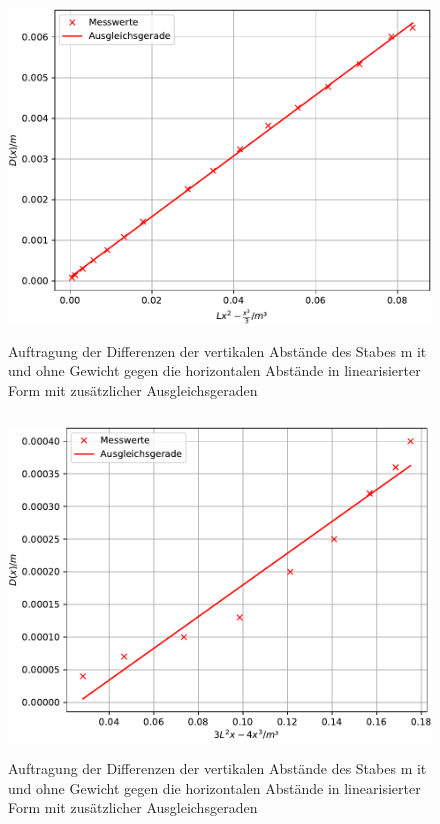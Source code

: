 \begin{figure}
  \centering
  \includegraphics[width=12cm, height=9cm]{./plots/Stange2.pdf}
  \caption{Auftragung der Differenzen der vertikalen Abstände des Stabes m      it und ohne Gewicht gegen die horizontalen Abstände in linearisierter Form       mit zusätzlicher Ausgleichsgeraden}
  \label{fig:plot2}
\end{figure}





\begin{figure}
  \centering
  \includegraphics[width=12cm, height=9cm]{./plots/Stange3a.pdf}
  \caption{Auftragung der Differenzen der vertikalen Abstände des Stabes m      it und ohne Gewicht gegen die horizontalen Abstände in linearisierter Form       mit zusätzlicher Ausgleichsgeraden}
  \label{fig:plot3a}
\end{figure}

